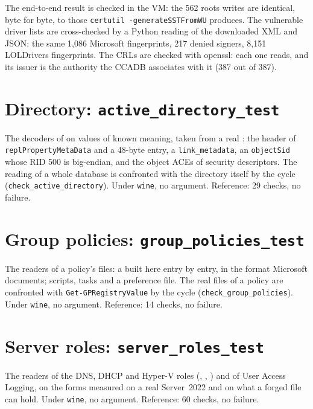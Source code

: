 \documentclass[11pt,a4paper,oneside]{report}
\begin{document}
The end-to-end result is checked in the VM: the 562 roots 
writes are identical, byte for byte, to those \texttt{certutil
-generateSSTFromWU} produces. The vulnerable driver lists are cross-checked by
a Python reading of the downloaded XML and JSON: the same 1,086 Microsoft
fingerprints, 217 denied signers, 8,151 LOLDrivers fingerprints. The CRLs
are checked with openssl: each one reads, and its issuer is the authority the
CCADB associates with it (387 out of 387).

\section{Directory: \texttt{active\_directory\_test}}

The decoders of  on values of known meaning, taken
from a real : the header of \texttt{replPropertyMetaData} and a
48-byte entry, a \texttt{link\_metadata}, an \texttt{objectSid} whose RID 500 is
big-endian, and the object ACEs of security descriptors. The reading of a whole
database is confronted with the directory itself by the cycle
(\texttt{check\_active\_directory}). Under \texttt{wine}, no argument. Reference:
29 checks, no failure.

\section{Group policies: \texttt{group\_policies\_test}}

The readers of a policy's files: a  built here entry by
entry, in the format Microsoft documents; scripts, tasks and a preference file.
The real files of a policy are confronted with \texttt{Get-GPRegistryValue} by
the cycle (\texttt{check\_group\_policies}). Under \texttt{wine}, no argument.
Reference: 14 checks, no failure.

\section{Server roles: \texttt{server\_roles\_test}}

The readers of the DNS, DHCP and Hyper-V roles (,
, ) and of User Access Logging, on the
forms measured on a real Server~2022 and on what a forged file can hold. Under
\texttt{wine}, no argument. Reference: 60 checks, no failure.
\end{document}
